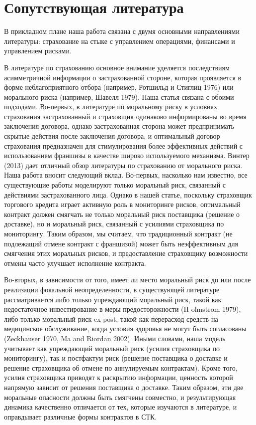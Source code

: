 \documentclass[a4paper,12pt]{article}
\begin{document}
\section{Сопутствующая литература}

В прикладном плане наша работа связана с двумя основными направлениями литературы: страхование на стыке с управлением операциями, финансами и управлением рисками.

В литературе по страхованию основное внимание уделяется последствиям асимметричной информации о застрахованной стороне, которая проявляется в форме неблагоприятного отбора (например, Ротшильд и Стиглиц 1976) или морального риска (например, Шавелл 1979). Наша статья связана с обоими подходами. Во-первых, в литературе по моральному риску в условиях страхования застрахованный и страховщик одинаково информированы во время заключения договора, однако застрахованная сторона может предпринимать скрытые действия после заключения договора, и оптимальный договор страхования предназначен для стимулирования более эффективных действий с использованием франшизы в качестве широко используемого механизма. Винтер (2013) дает отличный обзор литературы по страхованию от морального риска. Наша работа вносит следующий вклад. Во-первых, насколько нам известно, все существующие работы моделируют только моральный риск, связанный с действиями застрахованного лица. Однако в нашей статье, поскольку страховщик торгового кредита играет активную роль в мониторинге рисков, оптимальный контракт должен смягчать не только моральный риск поставщика (решение о доставке), но и моральный риск, связанный с усилиями страховщика по мониторингу. Таким образом, мы считаем, что традиционный контракт (не подлежащий отмене контракт с франшизой) может быть неэффективным для смягчения этих моральных рисков, и предоставление страховщику возможности отмены часто улучшает исполнение контракта.

Во-вторых, в зависимости от того, имеет ли место моральный риск до или после реализации фокальной неопределенности, в существующей литературе рассматривается либо только упреждающий моральный риск, такой как недостаточное инвестирование в меры предосторожности (H olmstrom 1979), либо только моральный риск ex-post, такой как перерасход средств на медицинское обслуживание, когда условия здоровья не могут быть согласованы (Zeckhauser 1970, Ma and Riordan 2002). Иными словами, наша модель учитывает как упреждающий моральный риск (усилия страховщика по мониторингу), так и постфактум риск (решение поставщика о доставке и решение страховщика об отмене по аннулируемым контрактам). Кроме того, усилия страховщика приводят к раскрытию информации, ценность которой напрямую зависит от решения поставщика о доставке. Таким образом, эти две моральные опасности должны быть смягчены совместно, и результирующая динамика качественно отличается от тех, которые изучаются в литературе, и оправдывает различные формы контрактов в СТК.
\end{document}

